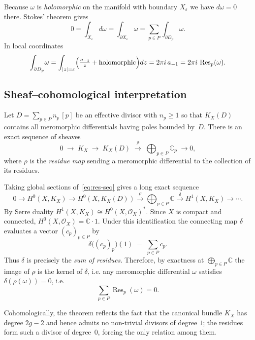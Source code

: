 \documentclass[12pt]{article}
\begin{document}
    Because $\omega$ is \emph{holomorphic} on the manifold with boundary $X_{\varepsilon}$ we have $d\omega=0$ there.  Stokes' theorem gives
    \[
      0 = \int_{X_{\varepsilon}} d\omega = \int_{\partial X_{\varepsilon}} \omega = \sum_{p\in P} \int_{\partial D_p} \omega.
    \]
    In local coordinates
    \[
      \int_{\partial D_p}\!\omega = \int_{|z|=\varepsilon} \Bigl(\tfrac{a_{-1}}{z}+\text{holomorphic}\Bigr)dz = 2\pi i\,a_{-1} = 2\pi i\,\operatorname{Res}_{p}(\omega).
    \]
    \subsection{Sheaf--cohomological interpretation}
    Let $D=\sum_{p\in P}n_p\,[p]$ be an effective divisor with $n_p\ge1$ so that $K_X(D)$ contains all meromorphic differentials having poles bounded by~$D$.  There is an exact sequence of sheaves
    \begin{equation}\label{eq:res-seq}
      0\;\longrightarrow\;K_X\;\longrightarrow\;K_X(D)\;\xrightarrow{\;\rho\;}\;\bigoplus_{p\in P}\mathbb C_{p}\;\longrightarrow 0,
    \end{equation}
    where $\rho$ is the \emph{residue map} sending a meromorphic differential to the collection of its residues.
    
    Taking global sections of~\eqref{eq:res-seq} gives a long exact sequence
    \[
      0 \longrightarrow H^{0}(X,K_X) \longrightarrow H^{0}(X,K_X(D)) \xrightarrow{\;\rho\;} \bigoplus_{p\in P}\mathbb C \xrightarrow{\;\delta\;} H^{1}(X,K_X) \longrightarrow \cdots.
    \]
    By Serre duality $H^{1}(X,K_X) \cong H^{0}(X,\mathcal O_X)^{*}$.  Since $X$ is compact and connected, $H^{0}(X,\mathcal O_X)=\mathbb C\cdot1$.  Under this identification the connecting map $\delta$ evaluates a vector $(c_p)_{p\in P}$ by
    \[
      \delta\bigl((c_p)_{p}\bigr)(1)\;=\;\sum_{p\in P} c_p.
    \]
    Thus $\delta$ is precisely the \emph{sum of residues}. Therefore, by exactness at $\bigoplus_{p\in P}\mathbb C$ the image of $\rho$ is the kernel of $\delta$, i.e. any meromorphic differential $\omega$ satisfies $\delta(\rho(\omega))=0$, i.e.
    \[
      \sum_{p\in P}\operatorname{Res}_{p}(\omega)=0.
    \]
    \begin{remark}
    Cohomologically, the theorem reflects the fact that the canonical bundle $K_X$ has degree $2g-2$ and hence admits no non-trivial divisors of degree $1$; the residues form such a divisor of degree~$0$, forcing the only relation among them.
    \end{remark}
    
\end{document}

